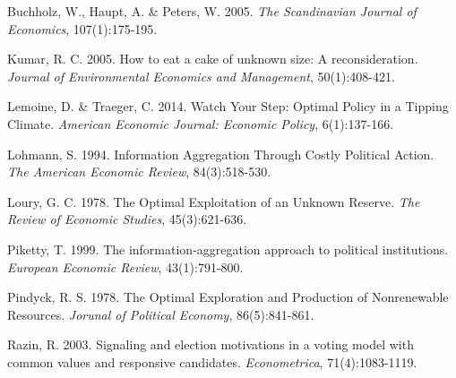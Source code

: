 \documentclass[11pt,preprint, authoryear]{elsarticle}
\numberwithin{equation}{section}
\numberwithin{figure}{section}
\numberwithin{table}{section}
\begin{document}
Buchholz, W., Haupt, A. \& Peters, W. 2005. \emph{The Scandinavian
Journal of Economics}, 107(1):175-195.

Kumar, R. C. 2005. How to eat a cake of unknown size: A reconsideration.
\emph{Journal of Environmental Economics and Management}, 50(1):408-421.

Lemoine, D. \& Traeger, C. 2014. Watch Your Step: Optimal Policy in a
Tipping Climate. \emph{American Economic Journal: Economic Policy},
6(1):137-166.

Lohmann, S. 1994. Information Aggregation Through Costly Political
Action. \emph{The American Economic Review}, 84(3):518-530.

Loury, G. C. 1978. The Optimal Exploitation of an Unknown Reserve.
\emph{The Review of Economic Studies}, 45(3):621-636.

Piketty, T. 1999. The information-aggregation approach to political
institutions. \emph{European Economic Review}, 43(1):791-800.

Pindyck, R. S. 1978. The Optimal Exploration and Production of
Nonrenewable Resources. \emph{Jorunal of Political Economy},
86(5):841-861.

Razin, R. 2003. Signaling and election motivations in a voting model
with common values and responsive candidates. \emph{Econometrica},
71(4):1083-1119.


\end{document}
